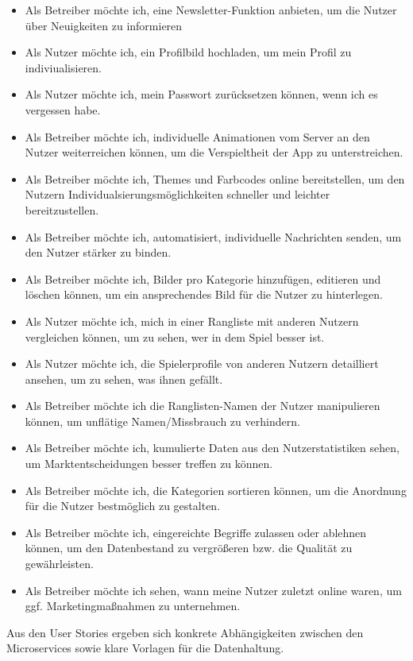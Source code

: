 {\begin{itemize}
	\item Als Betreiber möchte ich, eine Newsletter-Funktion anbieten, um die Nutzer über Neuigkeiten zu informieren
	\item Als Nutzer möchte ich, ein Profilbild hochladen, um mein Profil zu indiviualisieren.
	\item Als Nutzer möchte ich, mein Passwort zurücksetzen können, wenn ich es vergessen habe. 
	\item Als Betreiber möchte ich, individuelle Animationen vom Server an den Nutzer weiterreichen können, um die Verspieltheit der App zu unterstreichen.
	\item Als Betreiber möchte ich, Themes und Farbcodes online bereitstellen, um den Nutzern Individualsierungsmöglichkeiten schneller und leichter bereitzustellen.
	\item Als Betreiber möchte ich, automatisiert, individuelle Nachrichten senden, um den Nutzer stärker zu binden.
	\item Als Betreiber möchte ich, Bilder pro Kategorie hinzufügen, editieren und löschen können, um ein ansprechendes Bild für die Nutzer zu hinterlegen.
	\item Als Nutzer möchte ich, mich in einer Rangliste mit anderen Nutzern vergleichen können, um zu sehen, wer in dem Spiel besser ist.
	\item Als Nutzer möchte ich, die Spielerprofile von anderen Nutzern detailliert ansehen, um zu sehen, was ihnen gefällt. 
	\item Als Betreiber möchte ich die Ranglisten-Namen der Nutzer manipulieren können, um unflätige Namen/Missbrauch zu verhindern.
	\item Als Betreiber möchte ich, kumulierte Daten aus den Nutzerstatistiken sehen, um Marktentscheidungen besser treffen zu können.
	\item Als Betreiber möchte ich, die Kategorien sortieren können, um die Anordnung für die Nutzer bestmöglich zu gestalten.
	\item Als Betreiber möchte ich, eingereichte Begriffe zulassen oder ablehnen können, um den Datenbestand zu vergrößeren bzw. die Qualität zu gewährleisten.
	\item Als Betreiber möchte ich sehen, wann meine Nutzer zuletzt online waren, um ggf. Marketingmaßnahmen zu unternehmen.
	
\end{itemize}

Aus den User Stories ergeben sich konkrete Abhängigkeiten zwischen den Microservices sowie klare Vorlagen für die Datenhaltung.

}

